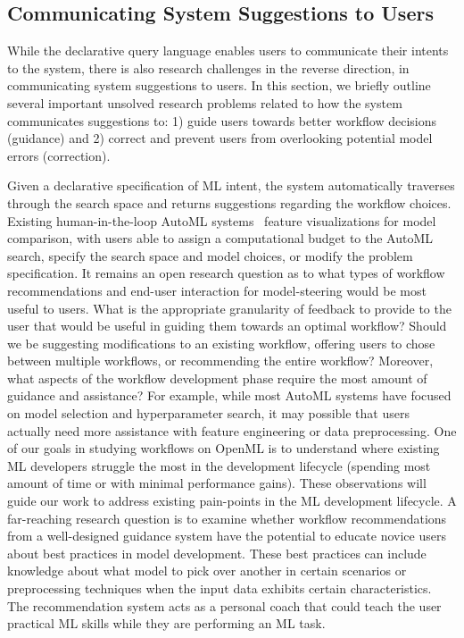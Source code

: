 \documentclass[11pt,dvipdfmx]{article}
\newcommand{\topic}[1]{\vspace{-3.5pt}\smallskip \smallskip \noindent{\bf #1.}}
\begin{document}
\subsection{Communicating System Suggestions to Users}
\par While the declarative query language enables users to communicate their intents to the system, there is also research challenges in the reverse direction, in communicating system suggestions to users. In this section, we briefly outline several important unsolved research problems related to how the system communicates suggestions to: 1)
guide users towards better workflow decisions (guidance) and 2) correct and prevent users from overlooking potential model errors (correction). 

\topic{Guidance Towards Optimal Workflow Decisions}
Given a declarative specification of ML intent, the system automatically
traverses through the search space and returns suggestions regarding the
workflow choices. Existing human-in-the-loop AutoML
systems~\cite{Wang2019,Cashman2018} feature visualizations for model
comparison, with users able to assign a computational budget to the
AutoML search, specify the search space and model choices, or modify the
problem specification. It remains an open research question as to what types
of workflow recommendations and end-user interaction for model-steering would
be most useful to users. What is the appropriate
granularity of feedback to provide to the user that would be useful in guiding
them towards an optimal workflow? Should we be suggesting modifications to an
existing workflow, offering users to chose between multiple workflows, or
recommending the entire workflow?
Moreover, what
aspects of the workflow development phase require the most amount of guidance
and assistance? For example, while most AutoML systems have focused on model
selection and hyperparameter search, it may possible that users actually need
more assistance with feature engineering or data preprocessing. One of our
goals in studying workflows on OpenML is to understand where existing ML
developers struggle the most in the development lifecycle (spending most
amount of time or with minimal performance gains). These observations will
guide our work to address existing pain-points in the ML development lifecycle.
A far-reaching research question is to examine whether workflow
recommendations from a well-designed guidance system have the potential to
educate novice users about best practices in model development. These best
practices can include knowledge about what model to pick over another in 
certain scenarios or preprocessing techniques when the input data
exhibits certain characteristics. The recommendation system acts as a personal
coach that could teach the user practical ML skills while they are performing
an ML task.
\end{document}
